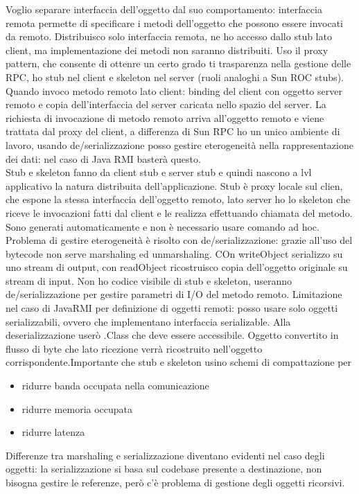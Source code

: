 \documentclass[16px]{article}
\begin{document}
Voglio separare interfaccia dell'oggetto dal suo comportamento: interfaccia remota permette di specificare i metodi dell'oggetto che possono essere invocati da remoto. Distribuisco solo interfaccia remota, ne ho accesso dallo stub lato client, ma implementazione dei metodi non saranno distribuiti. Uso il proxy pattern, che consente di ottenre un certo grado ti trasparenza nella gestione delle RPC, ho stub nel client e skeleton nel server (ruoli analoghi a Sun ROC stubs). Quando invoco metodo remoto lato client: binding del client con oggetto server remoto e copia dell'interfaccia del server caricata nello spazio del server. La richiesta di invocazione di metodo remoto arriva all'oggetto remoto e viene trattata dal proxy del client, a differenza di Sun RPC ho un unico ambiente di lavoro, usando de/serializzazione posso gestire eterogeneità nella rappresentazione dei dati: nel caso di Java RMI basterà questo.\\ Stub e skeleton fanno da client stub e server stub e quindi nascono a lvl applicativo la natura distribuita dell'applicazione. Stub è proxy locale sul clien, che espone la stessa interfaccia dell'oggetto remoto, lato server ho lo skeleton che riceve le invocazioni fatti dal client e le realizza effettuando chiamata del metodo.\\ Sono generati automaticamente e non è necessario usare comando ad hoc.\\ Problema di gestire eterogeneità è risolto con de/serializzazione: grazie all'uso del bytecode non serve marshaling ed unmarshaling. COn writeObject serializzo su uno stream di output, con readObject ricostruisco copia dell'oggetto originale su stream di input. Non ho codice visibile di stub e skeleton, useranno de/serializzazione per gestire parametri di I/O del metodo remoto. Limitazione nel caso di JavaRMI per definizione di oggetti remoti: posso usare solo oggetti serializzabili, ovvero che implementano interfaccia serializable. Alla deserializzazione userò .Class che deve essere accessibile. Oggetto convertito in flusso di byte che lato ricezione verrà ricostruito nell'oggetto corrispondente.Importante che stub e skeleton usino schemi di compattazione per
\begin{itemize}
\item ridurre banda occupata nella comunicazione
\item ridurre memoria occupata
\item ridurre latenza
\end{itemize}
Differenze tra marshaling e serializzazione diventano evidenti nel caso degli oggetti: la serializzazione si basa sul codebase presente a destinazione, non bisogna gestire le referenze, però c'è problema di gestione degli oggetti ricorsivi.
\end{document}
